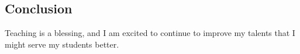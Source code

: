 \documentclass[12pt]{amsart}
\begin{document}

%





\subsection*{Conclusion}

Teaching is a blessing, and I am excited to continue to improve my
talents that I might serve my students better.
\end{document}
